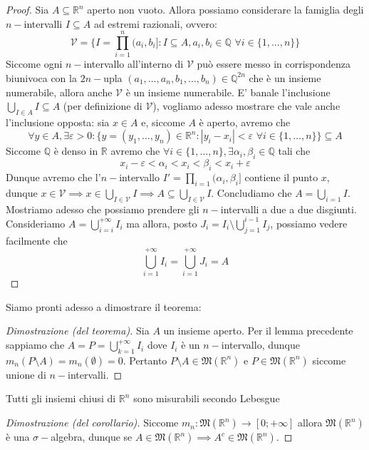 \begin{proof}
	Sia $A \subseteq \mathbb{R}^n$ aperto non vuoto. Allora possiamo considerare la famiglia degli $n-$intervalli $I \subseteq A$ ad estremi razionali, ovvero:
	$$\mathcal{V} = \{I = \prod_{i=1}^n (a_i, b_i] : I \subseteq A, a_i, b_i \in \mathbb{Q} \, \, \forall i \in \{1, \ldots, n\} \}$$
	Siccome ogni $n-$intervallo all'interno di $\mathcal{V}$ può essere messo in corrispondenza biunivoca con la $2n-$upla $(a_1, \ldots, a_n, b_1, \ldots, b_n) \in \mathbb{Q}^{2n}$ che è un insieme numerabile, allora anche $\mathcal{V}$ è un insieme numerabile. E' banale l'inclusione $\bigcup\limits_{I \in A} I \subseteq A$ (per definizione di $\mathcal{V}$), vogliamo
	adesso mostrare che vale anche l'inclusione opposta: sia $x \in A$ e, siccome $A$ è aperto, avremo che 
	$$\forall y \in A, \exists \varepsilon > 0 : \{y = (y_1, \ldots, y_n) \in \mathbb{R}^n : |y_i - x_i| < \varepsilon \, \, \forall i \in \{1, \ldots, n \} \} \subseteq A$$
	Siccome $\mathbb{Q}$ è denso in $\mathbb{R}$ avremo che $\forall i \in \{1, \ldots, n \}, \exists \alpha_i, \beta_i \in \mathbb{Q}$ tali che
	$$
	x_i - \varepsilon < \alpha_i < x_i < \beta_i < x_i + \varepsilon 
	$$
	Dunque avremo che l'$n-$intervallo $I'=\prod\limits_{i=1} (\alpha_i, \beta_i]$ contiene il punto $x$, dunque $x \in \mathcal{V} \implies x \in \bigcup\limits_{I \in \mathcal{V}} I \implies A \subseteq \bigcup_{I \in \mathcal{V}} I$. Concludiamo
	che $A = \bigcup\limits_{i=1} I$. \\
	Mostriamo adesso che possiamo prendere gli $n-$intervalli a due a due disgiunti. Consideriamo $A = \bigcup_{i=i}^{+\infty} I_i$ ma allora, posto $J_i = I_i \setminus \bigcup_{j=1}^{i-1} I_j$, possiamo vedere facilmente che
	$$
	\bigcup_{i=1}^{+\infty} I_i = \bigcup_{i=1}^{+\infty} J_i = A
	$$
\end{proof}
Siamo pronti adesso a dimostrare il teorema:
\begin{proof}[Dimostrazione (del teorema)]
	Sia $A$ un insieme aperto. Per il lemma precedente sappiamo che $A = P = \bigcup_{k=1}^{+\infty} I_i$ dove $I_i$ è un $n-$intervallo, dunque $m_n(P \setminus A) = m_n(\emptyset) = 0$.
	Pertanto $P \setminus A \in \mathfrak{M}(\mathbb{R}^n)$ e $P \in \mathfrak{M}(\mathbb{R}^n)$ siccome unione di $n-$intervalli. 
\end{proof}
\begin{cor}
	Tutti gli insiemi chiusi di $\mathbb{R}^n$ sono misurabili secondo Lebesgue
\end{cor}
\begin{proof}[Dimostrazione (del corollario)]
	Siccome $m_n: \mathfrak{M}(\mathbb{R}^n) \to [0; +\infty]$ allora $\mathfrak{M}(\mathbb{R}^n)$ è una $\sigma-$algebra, dunque se $A \in \mathfrak{M}(\mathbb{R}^n) \implies A^c \in \mathfrak{M}(\mathbb{R}^n)$.
\end{proof}
